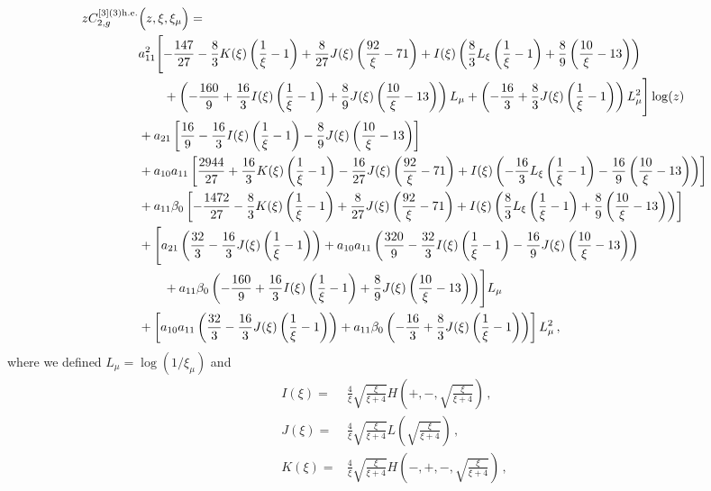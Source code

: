\documentclass[a4paper]{article}
\begin{document}
\begin{align}
		z C_{2,g}^{[3](3) \rm h.e.}&\Bigl(z,\xi,\xi_\mu\Bigr)= \notag \\
		& a_{11}^2\Biggl[-\frac{147}{27} - \frac{8}{3} K(\xi) \left(\frac{1}{\xi}-1\right) + \frac{8}{27} J(\xi) \left(\frac{92}{\xi} - 71\right) + I(\xi) \left(\frac{8}{3} L_\xi \left(\frac{1}{\xi}-1\right) + \frac{8}{9} \left(\frac{10}{\xi} - 13\right)\right) \notag\\
		& \qquad + \left(-\frac{160}{9} + \frac{16}{3} I(\xi) \left(\frac{1}{\xi}-1\right) + \frac{8}{9} J(\xi) \left(\frac{10}{\xi} - 13\right)\right) L_\mu + \left(-\frac{16}{3} + \frac{8}{3} J(\xi) \left(\frac{1}{\xi}-1\right)\right) L_\mu^2\Biggr] \log(z) \notag\\
		& + a_{21} \left[\frac{16}{9} - \frac{16}{3} I(\xi) \left(\frac{1}{\xi}-1\right) - \frac{8}{9} J(\xi) \left(\frac{10}{\xi} - 13\right)\right] \notag\\
		& + a_{10} a_{11} \left[\frac{2944}{27} + \frac{16}{3} K(\xi) \left(\frac{1}{\xi}-1\right) - \frac{16}{27} J(\xi) \left(\frac{92}{\xi} - 71\right) + I(\xi) \left(-\frac{16}{3} L_\xi \left(\frac{1}{\xi}-1\right) - \frac{16}{9} \left(\frac{10}{\xi} - 13\right)\right)\right] \notag\\
		& + a_{11} \beta_0 \left[-\frac{1472}{27} - \frac{8}{3} K(\xi) \left(\frac{1}{\xi}-1\right) + \frac{8}{27} J(\xi) \left(\frac{92}{\xi} - 71\right) + I(\xi) \left(\frac{8}{3} L_\xi \left(\frac{1}{\xi}-1\right) + \frac{8}{9} \left(\frac{10}{\xi} - 13\right)\right)\right] \notag\\
		& + \Biggl[a_{21} \left(\frac{32}{3} - \frac{16}{3} J(\xi) \left(\frac{1}{\xi}-1\right) \right) + a_{10} a_{11} \left(\frac{320}{9} - \frac{32}{3} I(\xi) \left(\frac{1}{\xi}-1\right) - \frac{16}{9} J(\xi) \left(\frac{10}{\xi} - 13\right)\right) \notag\\
		& \qquad+ a_{11} \beta_0 \left(-\frac{160}{9} + \frac{16}{3} I(\xi) \left(\frac{1}{\xi}-1\right) + \frac{8}{9} J(\xi) \left(\frac{10}{\xi} - 13\right)\right) \Biggr] L_\mu \notag\\
		& + \left[ a_{10} a_{11} \left(\frac{32}{3} - \frac{16}{3} J(\xi) \left(\frac{1}{\xi}-1 \right)\right) + a_{11} \beta_0 \left(-\frac{16}{3} + \frac{8}{3} J(\xi) \left(\frac{1}{\xi}-1\right)\right)\right] L_\mu^2\,, \label{C2_g3}
\end{align}
\endgroup
where we defined $L_\mu = \log\left(1/\xi_\mu\right)$ and
\begin{equation}
	\begin{split}
    I(\xi)=&\frac{4}{\xi}\sqrt{\frac{\xi}{\xi+4}}H \left(+,-,\sqrt{\frac{\xi}{\xi+4}}\right)\,, \\
    J(\xi)=&\frac{4}{\xi}\sqrt{\frac{\xi}{\xi+4}}L\left(\sqrt{\frac{\xi}{\xi+4}}\right)\,, \\
    K(\xi)=&\frac{4}{\xi}\sqrt{\frac{\xi}{\xi+4}}H\left(-,+,-,\sqrt{\frac{\xi}{\xi+4}}\right)\,,
	\end{split}
\end{equation}
\end{document}
